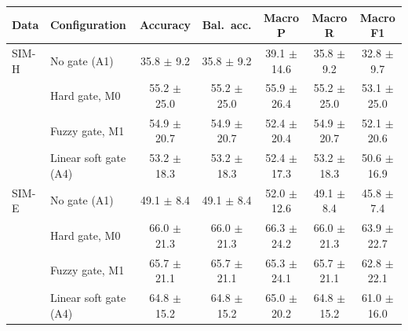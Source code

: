 \begin{tabular}{@{}llccccc@{}}
\toprule
Data & Configuration & Accuracy & Bal.\ acc. & Macro P & Macro R & Macro F1\\
\midrule
SIM-H & No gate (A1) & 35.8 $\pm$ 9.2 & 35.8 $\pm$ 9.2 & 39.1 $\pm$ 14.6 & 35.8 $\pm$ 9.2 & 32.8 $\pm$ 9.7\\
 & Hard gate, M0 & 55.2 $\pm$ 25.0 & 55.2 $\pm$ 25.0 & 55.9 $\pm$ 26.4 & 55.2 $\pm$ 25.0 & 53.1 $\pm$ 25.0\\
 & Fuzzy gate, M1 & 54.9 $\pm$ 20.7 & 54.9 $\pm$ 20.7 & 52.4 $\pm$ 20.4 & 54.9 $\pm$ 20.7 & 52.1 $\pm$ 20.6\\
 & Linear soft gate (A4) & 53.2 $\pm$ 18.3 & 53.2 $\pm$ 18.3 & 52.4 $\pm$ 17.3 & 53.2 $\pm$ 18.3 & 50.6 $\pm$ 16.9\\
\midrule
SIM-E & No gate (A1) & 49.1 $\pm$ 8.4 & 49.1 $\pm$ 8.4 & 52.0 $\pm$ 12.6 & 49.1 $\pm$ 8.4 & 45.8 $\pm$ 7.4\\
 & Hard gate, M0 & 66.0 $\pm$ 21.3 & 66.0 $\pm$ 21.3 & 66.3 $\pm$ 24.2 & 66.0 $\pm$ 21.3 & 63.9 $\pm$ 22.7\\
 & Fuzzy gate, M1 & 65.7 $\pm$ 21.1 & 65.7 $\pm$ 21.1 & 65.3 $\pm$ 24.1 & 65.7 $\pm$ 21.1 & 62.8 $\pm$ 22.1\\
 & Linear soft gate (A4) & 64.8 $\pm$ 15.2 & 64.8 $\pm$ 15.2 & 65.0 $\pm$ 20.2 & 64.8 $\pm$ 15.2 & 61.0 $\pm$ 16.0\\
\bottomrule
\end{tabular}
